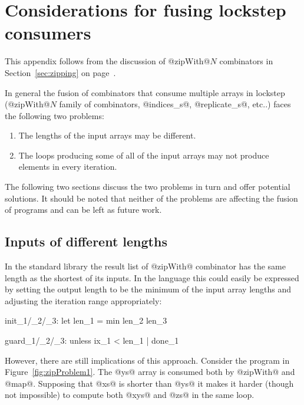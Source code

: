 \documentclass[preamble.tex]{subfiles}
\begin{document}
\clearpage

\chapter{Considerations for fusing lockstep consumers}
\label{ch:zipping-problems}

This appendix follows from the discussion of @zipWith@$N$ combinators in Section~\ref{sec:zipping} on page~\pageref{sec:zipping}.

In general the fusion of combinators that consume multiple arrays in lockstep (@zipWith@$N$ family of combinators, @indices_s@, @replicate_s@, etc..) faces the following two problems:

\begin{enumerate}
\item The lengths of the input arrays may be different.
\item The loops producing some of all of the input arrays may not produce elements in every iteration.
\end{enumerate}

The following two sections discuss the two problems in turn and offer potential solutions. It should be noted that neither of the problems are affecting the fusion of  programs and can be left as future work.


\clearpage
\section{Inputs of different lengths}

In the standard \Haskell library the result list of @zipWith@ combinator has the same length as the shortest of its inputs. In the \Loop language this could easily be expressed by setting the output length to be the minimum of the input array lengths and adjusting the iteration range appropriately:

\begin{loopcode}[%
  literate=
    {_1}{{\sub{zip}}}2
    {_2}{{\sub{xs}}}1
    {_3}{{\sub{ys}}}1,
]
init_1/_2/_3:
  let len_1 = min len_2 len_3

guard_1/_2/_3:
  unless ix_1 < len_1 | done_1
\end{loopcode}

However, there are still implications of this approach. Consider the program in Figure~\ref{fig:zipProblem1}. The @ys@ array is consumed both by @zipWith@ and @map@. Supposing that @xs@ is shorter than @ys@ it makes it harder (though not impossible) to compute both @xys@ and @zs@ in the same loop.
\end{document}
